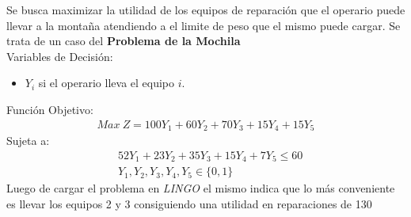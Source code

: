 

\begin{homeworkProblem}
Se busca maximizar la utilidad de los equipos de reparación que el operario puede llevar a la montaña atendiendo a el limite de peso que el mismo puede cargar. Se trata de un caso del \textbf{Problema de la Mochila}\\
Variables de Decisión:
\begin{itemize}
    \item $Y_i$ si el operario lleva el equipo $i$.
\end{itemize}
Función Objetivo:
\begin{align*}
    Max\ Z = 100Y_1 + 60Y_2 + 70Y_3 + 15Y_4 + 15Y_5
\end{align*}
Sujeta a:
\begin{align*}
    &   52Y_1 + 23Y_2 + 35Y_3 + 15Y_4 +7Y_5 \leq 60\\
    &Y_1,Y_2,Y_3,Y_4,Y_5 \in \{0,1\}
\end{align*}
Luego de cargar el problema en \textit{LINGO} el mismo indica que lo más conveniente es llevar los equipos 2 y 3 consiguiendo una utilidad en reparaciones de 130
\end{homeworkProblem}



